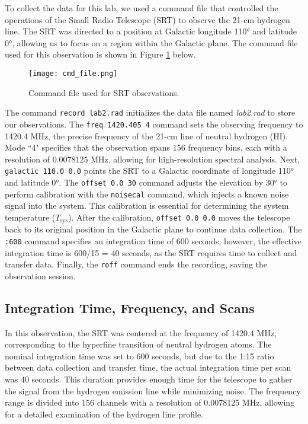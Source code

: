 \documentclass[linenumbers,twocolumn]{aastex631}
\begin{document}
To collect the data for this lab, we used a command file that controlled the operations of the Small Radio Telescope (SRT) to observe the 21-cm hydrogen line. The SRT was directed to a position at Galactic longitude 110° and latitude 0°, allowing us to focus on a region within the Galactic plane. The command file used for this observation is shown in Figure \ref{fig:cmdfile} below.

\begin{figure}[h]
    \centering
    \texttt{[image: cmd\_file.png]}
    \caption{Command file used for SRT observations.}
    \label{fig:cmdfile}
\end{figure}

The command \texttt{record lab2.rad} initializes the data file named \textit{lab2.rad} to store our observations. The \texttt{freq 1420.405 4} command sets the observing frequency to 1420.4 MHz, the precise frequency of the 21-cm line of neutral hydrogen (HI). Mode ``4" specifies that the observation spans 156 frequency bins, each with a resolution of 0.0078125 MHz, allowing for high-resolution spectral analysis. Next, \texttt{galactic 110.0 0.0} points the SRT to a Galactic coordinate of longitude 110° and latitude 0°. The \texttt{offset 0.0 30} command adjusts the elevation by 30° to perform calibration with the \texttt{noisecal} command, which injects a known noise signal into the system. This calibration is essential for determining the system temperature ($T_{\text{sys}}$). After the calibration, \texttt{offset 0.0 0.0} moves the telescope back to its original position in the Galactic plane to continue data collection. The \texttt{:600} command specifies an integration time of 600 seconds; however, the effective integration time is 600/15 = 40 seconds, as the SRT requires time to collect and transfer data. Finally, the \texttt{roff} command ends the recording, saving the observation session.

\subsection{Integration Time, Frequency, and Scans}

In this observation, the SRT was centered at the frequency of 1420.4 MHz, corresponding to the hyperfine transition of neutral hydrogen atoms. The nominal integration time was set to 600 seconds, but due to the 1:15 ratio between data collection and transfer time, the actual integration time per scan was 40 seconds. This duration provides enough time for the telescope to gather the signal from the hydrogen emission line while minimizing noise. The frequency range is divided into 156 channels with a resolution of 0.0078125 MHz, allowing for a detailed examination of the hydrogen line profile.
\end{document}
